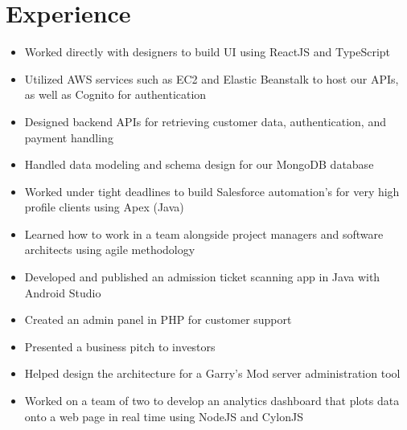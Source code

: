 \documentclass{cv}
\begin{document}
	\section{Experience}
	\begin{itemize}
		\item Worked directly with designers to build UI using ReactJS and TypeScript
		\item Utilized AWS services such as EC2 and Elastic Beanstalk to host our APIs, as well as Cognito for authentication
		\item Designed backend APIs for retrieving customer data, authentication, and payment handling
		\item Handled data modeling and schema design for our MongoDB database
	\end{itemize}

	\begin{itemize}
		\item Worked under tight deadlines to build Salesforce automation's for very high profile clients using Apex (Java)
		\item Learned how to work in a team alongside project managers and software architects using agile methodology
	\end{itemize}

	\begin{itemize}
		\item Developed and published an admission ticket scanning app in Java with Android Studio
		\item Created an admin panel in PHP for customer support 
		\item Presented a business pitch to investors
	\end{itemize}

	\begin{itemize}
		\item Helped design the architecture for a Garry’s Mod server administration tool
	\end{itemize}

	\begin{itemize}
		\item Worked on a team of two to develop an analytics dashboard that plots data onto a web page in real time using NodeJS and CylonJS
	\end{itemize}


	
\end{document}
